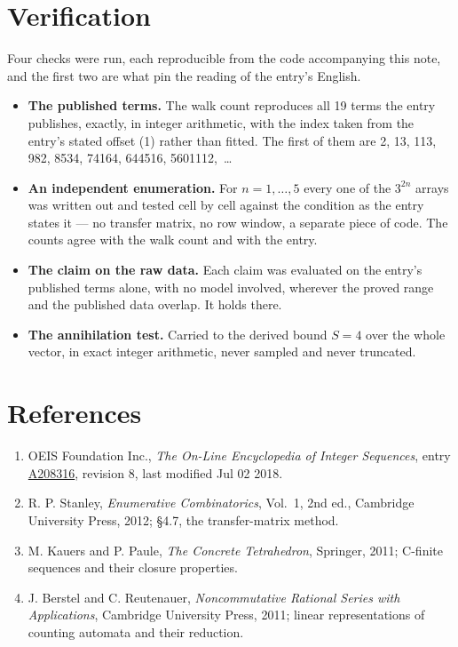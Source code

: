 \documentclass[11pt]{article}
\theoremstyle{definition}
\begin{document}
\section{Verification}

Four checks were run, each reproducible from the code accompanying this note, and the first two are what pin the reading of the entry's English.

\begin{itemize}

\item {\bfseries The published terms.} The walk count reproduces all 19 terms the entry publishes, exactly, in integer arithmetic, with the index taken from the entry's stated offset (1) rather than fitted. The first of them are 2, 13, 113, 982, 8534, 74164, 644516, 5601112,~\dots

\item {\bfseries An independent enumeration.} For $n = 1,\dots,5$ every one of the $3^{2n}$ arrays was written out and tested cell by cell against the condition as the entry states it --- no transfer matrix, no row window, a separate piece of code. The counts agree with the walk count and with the entry.

\item {\bfseries The claim on the raw data.} Each claim was evaluated on the entry's published terms alone, with no model involved, wherever the proved range and the published data overlap. It holds there.

\item {\bfseries The annihilation test.} Carried to the derived bound $S = 4$ over the whole vector, in exact integer arithmetic, never sampled and never truncated.

\end{itemize}

\section{References}

\begin{enumerate}

\item OEIS Foundation Inc., \emph{The On-Line Encyclopedia of Integer Sequences}, entry \href{https://oeis.org/A208316}{A208316}, revision 8, last modified Jul 02 2018.

\item R. P. Stanley, \emph{Enumerative Combinatorics}, Vol.~1, 2nd ed., Cambridge University Press, 2012; \S4.7, the transfer-matrix method.

\item M. Kauers and P. Paule, \emph{The Concrete Tetrahedron}, Springer, 2011; C-finite sequences and their closure properties.

\item J. Berstel and C. Reutenauer, \emph{Noncommutative Rational Series with Applications}, Cambridge University Press, 2011; linear representations of counting automata and their reduction.

\end{enumerate}
\end{document}
